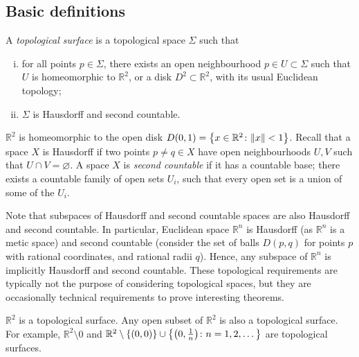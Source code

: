 \subsection{Basic definitions}
\begin{definition}
	A \textit{topological surface} is a topological space \( \Sigma \) such that
	\begin{enumerate}[(i)]
		\item for all points \( p \in \Sigma \), there exists an open neighbourhood \( p \in U \subset \Sigma \) such that \( U \) is homeomorphic to \( \mathbb R^2 \), or a disk \( D^2 \subset \mathbb R^2 \), with its usual Euclidean topology;
		\item \( \Sigma \) is Hausdorff and second countable.
	\end{enumerate}
\end{definition}
\begin{remark}
	\( \mathbb R^2 \) is homeomorphic to the open disk \( D(0,1) = \qty{ x \in \mathbb R^2 \colon \norm{x} < 1 } \).
	Recall that a space \( X \) is Hausdorff if two points \( p \neq q \in X \) have open neighbourhoods \( U, V \) such that \( U \cap V = \varnothing \).
	A space \( X \) is \textit{second countable} if it has a countable base; there exists a countable family of open sets \( U_i \), such that every open set is a union of some of the \( U_i \).

	Note that subspaces of Hausdorff and second countable spaces are also Hausdorff and second countable.
	In particular, Euclidean space \( \mathbb R^n \) is Hausdorff (as \( \mathbb R^n \) is a metic space) and second countable (consider the set of balls \( D(p,q) \) for points \( p \) with rational coordinates, and rational radii \( q \)).
	Hence, any subspace of \( \mathbb R^n \) is implicitly Hausdorff and second countable.
	These topological requirements are typically not the purpose of considering topological spaces, but they are occasionally technical requirements to prove interesting theorems.
\end{remark}
\begin{example}
	\( \mathbb R^2 \) is a topological surface.
	Any open subset of \( \mathbb R^2 \) is also a topological surface.
	For example, \( \mathbb R^2 \setminus \qty{0} \) and \( \mathbb R^2 \setminus \qty{(0,0)} \cup \qty{\qty(0, \frac{1}{n}) \colon n = 1, 2, \dots} \) are topological surfaces.
\end{example}
